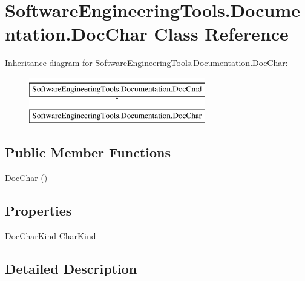 \hypertarget{class_software_engineering_tools_1_1_documentation_1_1_doc_char}{\section{Software\+Engineering\+Tools.\+Documentation.\+Doc\+Char Class Reference}
\label{class_software_engineering_tools_1_1_documentation_1_1_doc_char}
}
Inheritance diagram for Software\+Engineering\+Tools.\+Documentation.\+Doc\+Char\+:\begin{figure}[H]
\begin{center}
\leavevmode
\includegraphics[height=2.000000cm]{class_software_engineering_tools_1_1_documentation_1_1_doc_char}
\end{center}
\end{figure}
\subsection*{Public Member Functions}
\begin{DoxyCompactItemize}
\item 
\hyperlink{class_software_engineering_tools_1_1_documentation_1_1_doc_char_a5507d77e59a8298e33b42cf03a4fd04f}{Doc\+Char} ()
\end{DoxyCompactItemize}
\subsection*{Properties}
\begin{DoxyCompactItemize}
\item 
\hyperlink{namespace_software_engineering_tools_1_1_documentation_a0c5911a87d97bd4d61eaf7e0d5fe2d35}{Doc\+Char\+Kind} \hyperlink{class_software_engineering_tools_1_1_documentation_1_1_doc_char_acfbf2602f5651fee6ce37905604c9f8c}{Char\+Kind}
\end{DoxyCompactItemize}


\subsection{Detailed Description}


